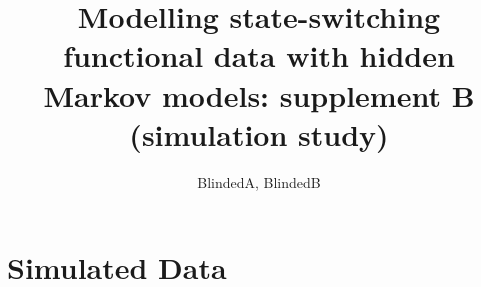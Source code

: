 \documentclass{article}
\begin{document}



\title{Modelling state-switching functional data with hidden Markov models: supplement B (simulation study)}%
\date{}
\author{BlindedA, BlindedB}%


\maketitle

\addtocounter{tablenum}{1}
\addtocounter{fignum}{1}


    \section{Simulated Data}
    
\end{document}
